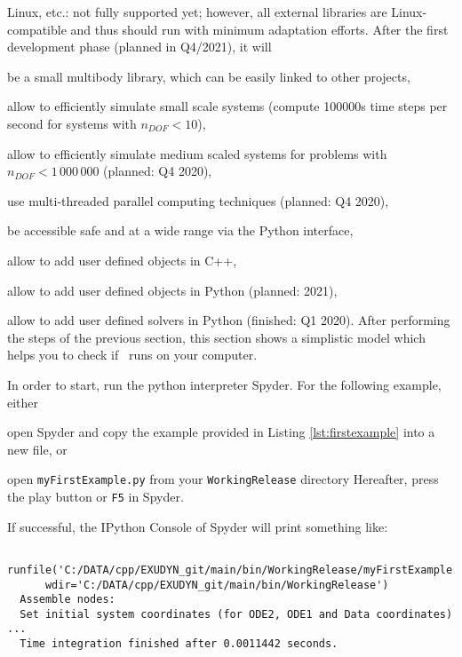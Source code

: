 	\ei
	\item Linux, etc.: not fully supported yet; however, all external libraries are Linux-compatible and thus should run with minimum adaptation efforts.
\ei
%
After the first development phase (planned in Q4/2021), it will
\bi
  \item be a small multibody library, which can be easily linked to other projects,
	\item allow to efficiently simulate small scale systems (compute 100000s time steps per second for systems with $n_{DOF}<10$),
	\item allow to efficiently simulate medium scaled systems for problems with $n_{DOF} < 1\,000\,000$ (planned: Q4 2020),
	\item use multi-threaded parallel computing techniques (planned: Q4 2020),
	\item be accessible safe and at a wide range via the Python interface,
	\item allow to add user defined objects in C++,
	\item allow to add user defined objects in Python (planned: 2021),
	\item allow to add user defined solvers in Python (finished: Q1 2020).
\ei
%
After performing the steps of the previous section, this section shows a simplistic model which helps you to check if \codeName\ runs on your computer.

In order to start, run the python interpreter Spyder.
For the following example, either 
\bi
	\item open Spyder and copy the example provided in Listing \ref{lst:firstexample} into a new file, or
	\item open \texttt{myFirstExample.py} from your \texttt{WorkingRelease} directory
\ei
Hereafter, press the play button or \texttt{F5} in Spyder.
%

If successful, the IPython Console of Spyder will print something like:
\plainlststyle
{\ttfamily \footnotesize
\begin{lstlisting}
  runfile('C:/DATA/cpp/EXUDYN_git/main/bin/WorkingRelease/myFirstExample.py', 
	  wdir='C:/DATA/cpp/EXUDYN_git/main/bin/WorkingRelease')
  Assemble nodes:
  Set initial system coordinates (for ODE2, ODE1 and Data coordinates) ...
  Time integration finished after 0.0011442 seconds.
\end{lstlisting}
}

